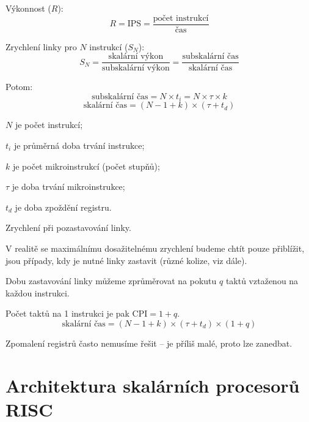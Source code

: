 \begin{compactitem}
\begin{compactitem}
        \item Výkonnost ($R$):
        $$ R = \text{IPS} = \frac{\text{počet instrukcí}}{\text{čas}} $$

        \item Zrychlení linky pro $N$ instrukcí ($S_N$):
        $$ S_N = \frac{\text{skalární výkon}}{\text{subskalární výkon}} = \frac{\text{subskalární čas}}{\text{skalární čas}} $$

        \item Potom:
        $$ \text{subskalární čas} = N \times t_i = N \times \tau \times k $$
        $$ \text{skalární čas} = (N - 1 + k) \times (\tau + t_d) $$
        \begin{compactitem}
            \item $N$ je počet instrukcí;
            \item $t_i$ je průměrná doba trvání instrukce;
            \item $k$ je počet mikroinstrukcí (počet stupňů);
            \item $\tau$ je doba trvání mikroinstrukce;
            \item $t_d$ je doba zpoždění registru.
        \end{compactitem}
    \end{compactitem}

    \item Zrychlení při pozastavování linky. \begin{compactitem}
        \item V realitě se maximálnímu dosažitelnému zrychlení budeme chtít pouze přiblížit, jsou případy, kdy je nutné linky zastavit (různé kolize, viz dále).
        \item Dobu zastavování linky můžeme zprůměrovat na pokutu $q$ taktů vztaženou na každou instrukci.
        \item Počet taktů na 1 instrukci je pak $\text{CPI} = 1+q$.
        $$ \text{skalární čas} = (N - 1 + k) \times (\tau + t_d) \times (1 + q) $$

        \item Zpomalení registrů často nemusíme řešit -- je příliš malé, proto lze zanedbat.
    \end{compactitem}

\end{compactitem}


\section{Architektura skalárních procesorů RISC}

